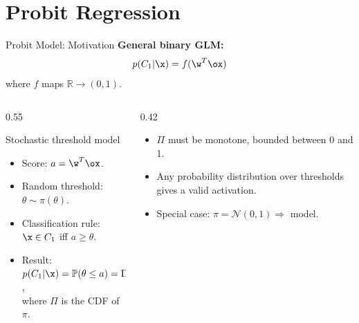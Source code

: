 \section{Probit Regression}

\begin{frame}{Probit Model: Motivation}
  \textbf{General binary GLM:}
  \[
    p(C_1|\x) = f(\w^T\ox)
  \]
  where $f$ maps $\mathbb{R} \to (0,1)$.\\[0.4em]
  \begin{columns}[T]
    \begin{column}{0.55\textwidth}
      \begin{block}{Stochastic threshold model}
        \begin{itemize}
          \item Score: $a = \w^T\ox$.
          \item Random threshold: $\theta \sim \pi(\theta)$.
          \item Classification rule: $\x \in C_1$ iff $a \geq \theta$.
          \item Result: $p(C_1|\x) = \mathbb{P}(\theta \leq a) = \Pi(a)$,\\
                        where $\Pi$ is the CDF of $\pi$.
        \end{itemize}
      \end{block}
    \end{column}
    \begin{column}{0.42\textwidth}
      \begin{itemize}
        \item $\Pi$ must be monotone, bounded between 0 and 1.
        \item Any probability distribution over thresholds gives a valid activation.
        \item Special case: $\pi = \mathcal{N}(0,1) \Rightarrow$  model.
      \end{itemize}
    \end{column}
  \end{columns}
\end{frame}


